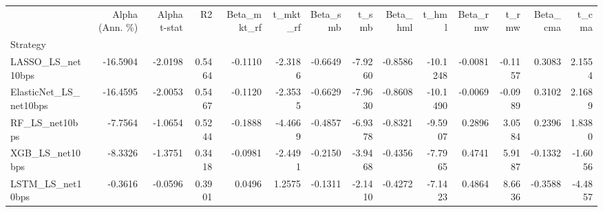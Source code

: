 \begin{tabular}{lrrrrrrrrrrrrr}
\toprule
 & Alpha (Ann. \%) & Alpha t-stat & R2 & Beta\_mkt\_rf & t\_mkt\_rf & Beta\_smb & t\_smb & Beta\_hml & t\_hml & Beta\_rmw & t\_rmw & Beta\_cma & t\_cma \\
Strategy &  &  &  &  &  &  &  &  &  &  &  &  &  \\
\midrule
LASSO\_LS\_net10bps & -16.5904 & -2.0198 & 0.5464 & -0.1110 & -2.3186 & -0.6649 & -7.9260 & -0.8586 & -10.1248 & -0.0081 & -0.1157 & 0.3083 & 2.1554 \\
ElasticNet\_LS\_net10bps & -16.4595 & -2.0053 & 0.5467 & -0.1120 & -2.3535 & -0.6629 & -7.9630 & -0.8608 & -10.1490 & -0.0069 & -0.0989 & 0.3102 & 2.1689 \\
RF\_LS\_net10bps & -7.7564 & -1.0654 & 0.5244 & -0.1888 & -4.4669 & -0.4857 & -6.9378 & -0.8321 & -9.5907 & 0.2896 & 3.0584 & 0.2396 & 1.8380 \\
XGB\_LS\_net10bps & -8.3326 & -1.3751 & 0.3418 & -0.0981 & -2.4491 & -0.2150 & -3.9468 & -0.4356 & -7.7965 & 0.4741 & 5.9187 & -0.1332 & -1.6056 \\
LSTM\_LS\_net10bps & -0.3616 & -0.0596 & 0.3901 & 0.0496 & 1.2575 & -0.1311 & -2.1410 & -0.4272 & -7.1423 & 0.4864 & 8.6636 & -0.3588 & -4.4857 \\
\bottomrule
\end{tabular}
